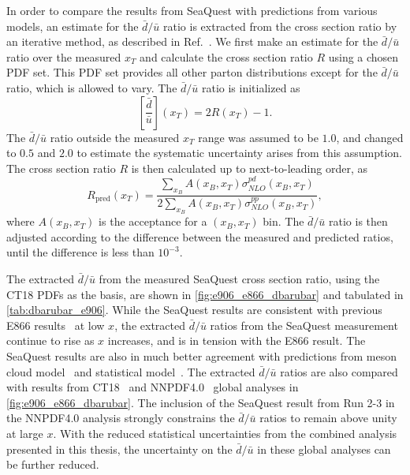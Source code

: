 \documentclass[../main.tex]{subfiles}
\begin{document}
In order to compare the results from SeaQuest with predictions from various models,
an estimate for the $\bar{d}/\bar{u}$ ratio is extracted from the cross section ratio by
an iterative method, as described in Ref.~\cite{dove2021}.
We first make an estimate for the $\bar{d}/\bar{u}$ ratio over the measured $x_T$
and calculate the cross section ratio $R$ using a chosen PDF set.
This PDF set provides all other parton distributions except for the $\bar{d}/\bar{u}$ ratio,
which is allowed to vary. The $\bar{d}/\bar{u}$ ratio is initialized as
\begin{equation}
	\left[\frac{\bar{d}}{\bar{u}}\right]\left(x_T\right) = 2R\left(x_T\right)-1.
\end{equation}
The $\bar{d}/\bar{u}$ ratio outside the measured $x_T$ range was assumed to be $1.0$,
and changed to $0.5$ and $2.0$ to estimate the systematic uncertainty arises from this assumption.
The cross section ratio $R$ is then calculated up to next-to-leading order, as
\begin{equation}
	R_{\mathrm{pred}}\left(x_T\right)  = \frac{\sum_{x_B} A\left(x_B, x_T\right)\sigma^{pd}_{NLO}\left(x_B, x_T\right)}{2\sum_{x_B} A\left(x_B, x_T\right)\sigma^{pp}_{NLO}\left(x_B, x_T\right)},
\end{equation}
where $A\left(x_B,x_T\right)$ is the acceptance for a $\left(x_B, x_T\right)$ bin.
The $\bar{d}/\bar{u}$ ratio is then adjusted according to the difference between
the measured and predicted ratios, until the difference is less than $10^{-3}$.

The extracted $\bar{d}/\bar{u}$ from the measured SeaQuest cross section ratio,
using the CT18 PDFs as the basis, are shown in \cref{fig:e906_e866_dbarubar}
and tabulated in \cref{tab:dbarubar_e906}.
While the SeaQuest results are consistent with previous E866 results~\cite{towell2001} at low $x$,
the extracted $\bar{d}/\bar{u}$ ratios from the SeaQuest measurement continue to rise as $x$ increases,
and is in tension with the E866 result.
The SeaQuest results are also in much better agreement with predictions from meson cloud model~\cite{alberg2022}
and statistical model~\cite{soffer2019}.
The extracted $\bar{d}/\bar{u}$ ratios are also compared with results from CT18~\cite{hou2021} and NNPDF4.0~\cite{ball2022a}
global analyses in \cref{fig:e906_e866_dbarubar}.
The inclusion of the SeaQuest result from Run 2-3 in the NNPDF4.0 analysis strongly constrains the $\bar{d}/\bar{u}$ ratios
to remain above unity at large $x$.
With the reduced statistical uncertainties from the combined analysis presented in this thesis,
the uncertainty on the $\bar{d}/\bar{u}$ in these global analyses can be further reduced.
\end{document}
